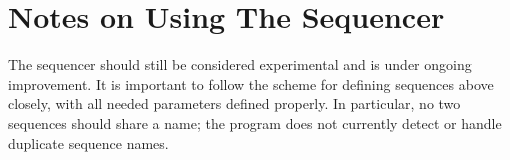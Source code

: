 \section{Notes on Using The Sequencer}

The sequencer should still be considered experimental and is under ongoing improvement. It is important to follow the scheme for defining sequences above closely, with all needed parameters defined properly. In particular, no two sequences should share a name; the program does not currently detect or handle duplicate sequence names.
